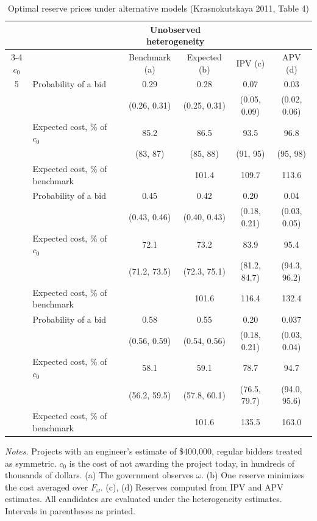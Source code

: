 \begin{table}[htbp]
\centering
\caption{Optimal reserve prices under alternative models (Krasnokutskaya 2011, Table 4)}
\label{tab:15-krasno-reserve}
{\small
\setlength{\tabcolsep}{4pt}
\begin{tabular}{clcccc}
\toprule
 & & \multicolumn{2}{c}{Unobserved heterogeneity} & & \\
\cmidrule(lr){3-4}
$c_0$ & & Benchmark (a) & Expected (b) & IPV (c) & APV (d)\\
\midrule
5 & Probability of a bid & 0.29 & 0.28 & 0.07 & 0.03\\
  & & (0.26, 0.31) & (0.25, 0.31) & (0.05, 0.09) & (0.02, 0.06)\\
  & Expected cost, \% of $c_0$ & 85.2 & 86.5 & 93.5 & 96.8\\
  & & (83, 87) & (85, 88) & (91, 95) & (95, 98)\\
  & Expected cost, \% of benchmark & & 101.4 & 109.7 & 113.6\\
\addlinespace
7 & Probability of a bid & 0.45 & 0.42 & 0.20 & 0.04\\
  & & (0.43, 0.46) & (0.40, 0.43) & (0.18, 0.21) & (0.03, 0.05)\\
  & Expected cost, \% of $c_0$ & 72.1 & 73.2 & 83.9 & 95.4\\
  & & (71.2, 73.5) & (72.3, 75.1) & (81.2, 84.7) & (94.3, 96.2)\\
  & Expected cost, \% of benchmark & & 101.6 & 116.4 & 132.4\\
\addlinespace
10 & Probability of a bid & 0.58 & 0.55 & 0.20 & 0.037\\
   & & (0.56, 0.59) & (0.54, 0.56) & (0.18, 0.21) & (0.03, 0.04)\\
   & Expected cost, \% of $c_0$ & 58.1 & 59.1 & 78.7 & 94.7\\
   & & (56.2, 59.5) & (57.8, 60.1) & (76.5, 79.7) & (94.0, 95.6)\\
   & Expected cost, \% of benchmark & & 101.6 & 135.5 & 163.0\\
\bottomrule
\end{tabular}}

\smallskip
\begin{minipage}{0.93\textwidth}
\footnotesize \textit{Notes.} Projects with an engineer's estimate of \$400,000, regular bidders treated as
symmetric. $c_0$ is the cost of not awarding the project today, in hundreds of thousands of dollars.
(a) The government observes $\omega$. (b) One reserve minimizes the cost averaged over $F_\omega$. (c),
(d) Reserves computed from IPV and APV estimates. All candidates are evaluated under the heterogeneity
estimates. Intervals in parentheses as printed.
\end{minipage}
\end{table}

